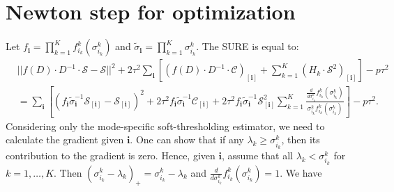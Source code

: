 \section{Newton step for optimization}
Let $f_{\mathbf{i}} = \prod_{k=1}^Kf_{i_k}^k(\sigma_{i_k}^k)$ and $\tilde{\sigma}_{\mathbf{i}} = \prod_{k=1}^K\sigma_{i_k}^k$. The SURE is equal to:
\begin{align}
&||f(D) \cdot D ^{-1} \cdot \mathcal{S} - \mathcal{S}||^2 + 2\tau^2 \sum_{\mathbf{i}} \left[\left(f(D) \cdot D^{-1} \cdot \mathcal{C}\right)_{[\mathbf{i}]} + \sum_{k=1}^K \left(H_k \cdot \mathcal{S}^2\right)_{[\mathbf{i}]}\right] - p \tau^2\\
& = \sum_{\mathbf{i}}\left[\left(f_{\mathbf{i}}\tilde{\sigma}^{-1}_{\mathbf{i}}\mathcal{S}_{[\mathbf{i}]} - \mathcal{S}_{[\mathbf{i}]}\right)^2 + 2\tau^2f_{\mathbf{i}}\tilde{\sigma}^{-1}_{\mathbf{i}}\mathcal{C}_{[\mathbf{i}]} + 2\tau^2f_{\mathbf{i}}\tilde{\sigma}^{-1}_{\mathbf{i}}\mathcal{S}_{[\mathbf{i}]}^2 \sum_{k=1}^K\frac{\frac{d}{d\sigma_{i_k}^k}f_{i_k}^k(\sigma_{i_k}^k)}{\sigma_{i_k}^kf_{i_k}^k(\sigma_{i_k}^k)}\right] - p\tau^2. \label{equation:sum.sure}
\end{align}
Considering only the mode-specific soft-thresholding estimator, we need to calculate the gradient given $\mathbf{i}$. One can show that if any $\lambda_k \geq \sigma_{i_k}^k$, then its contribution to the gradient is zero. Hence, given $\mathbf{i}$, assume that all $\lambda_k < \sigma_{i_k}^k$ for $k = 1,\ldots,K$. Then $(\sigma_{i_k}^k - \lambda_k)_+ = \sigma_{i_k}^k - \lambda_k$ and $\frac{d}{d\sigma_{i_k}^k}f_{i_k}^k(\sigma_{i_k}^k) = 1$. We have
